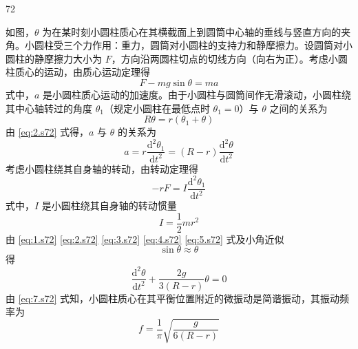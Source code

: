 \begin{solution}{72}
    \begin{subsolution}
        如图，$\theta$ 为在某时刻小圆柱质心在其横截面上到圆筒中心轴的垂线与竖直方向的夹角。小圆柱受三个力作用：重力，圆筒对小圆柱的支持力和静摩擦力。设圆筒对小圆柱的静摩擦力大小为 $F$，方向沿两圆柱切点的切线方向（向右为正）。考虑小圆柱质心的运动，由质心运动定理得
        \begin{equation}
            F - m g \sin \theta = m a
            \label{eq:1.s72}
        \end{equation}
        式中，$a$ 是小圆柱质心运动的加速度。由于小圆柱与圆筒间作无滑滚动，小圆柱绕其中心轴转过的角度 $\theta_{1}$（规定小圆柱在最低点时 $\theta_{1}=0$）与 $\theta$ 之间的关系为
        \begin{equation}
            R \theta = r (\theta_{1} + \theta)
            \label{eq:2.s72}
        \end{equation}
        由 \eqref{eq:2.s72} 式得，$a$ 与 $\theta$ 的关系为
        \begin{equation}
            a = r \frac{\mathrm{d}^{2} \theta_{1}}{\mathrm{d} t^{2}} = (R - r) \frac{\mathrm{d}^{2} \theta}{\mathrm{d} t^{2}}
            \label{eq:3.s72}
        \end{equation}
        考虑小圆柱绕其自身轴的转动，由转动定理得
        \begin{equation}
            - r F = I \frac{\mathrm{d}^{2} \theta_{1}}{\mathrm{d} t^{2}}
            \label{eq:4.s72}
        \end{equation}
        式中，$I$ 是小圆柱绕其自身轴的转动惯量
        \begin{equation}
            I = \frac{1}{2} m r^{2}
            \label{eq:5.s72}
        \end{equation}
        由 \eqref{eq:1.s72} \eqref{eq:2.s72} \eqref{eq:3.s72} \eqref{eq:4.s72} \eqref{eq:5.s72} 式及小角近似
        \begin{equation}
            \sin \theta \approx \theta
            \label{eq:6.s72}
        \end{equation}
        得
        \begin{equation}
            \frac{\mathrm{d}^{2} \theta}{\mathrm{d} t^{2}} + \frac{2 g}{3 (R - r)} \theta = 0
            \label{eq:7.s72}
        \end{equation}
        由 \eqref{eq:7.s72} 式知，小圆柱质心在其平衡位置附近的微振动是简谐振动，其振动频率为
        \begin{equation}
            f = \frac{1}{\pi} \sqrt{\frac{g}{6 (R - r)}}

\end{equation}
\end{subsolution}
\end{solution}
